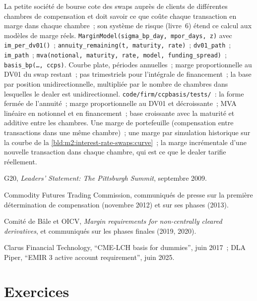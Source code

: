 \begin{build}
 La petite société de bourse cote des swaps auprès de clients de différentes
chambres de compensation et doit savoir ce que coûte chaque transaction en marge dans chaque
chambre~; son système de risque (livre~6) étend ce calcul
aux modèles de marge réels.
 \texttt{MarginModel(sigma\_bp\_day, mpor\_days, z)} avec
\texttt{im\_per\_dv01()}~; \texttt{annuity\_remaining(t, maturity, rate)}~;
\texttt{dv01\_path}~; \texttt{im\_path}~; \texttt{mva(notional, maturity, rate,
model, funding\_spread)}~; \texttt{basis\_bp(\ldots, ccps)}.
 Courbe plate, périodes annuelles~; marge proportionnelle au DV01 du swap
restant~; pas trimestriels pour l'intégrale de financement~; la base par position
unidirectionnelle, multipliée par le nombre de chambres dans lesquelles le dealer est
unidirectionnel.
 \texttt{code/firm/ccpbasis/tests/}~: la forme fermée de
l'annuité~; marge proportionnelle au DV01 et décroissante~; MVA linéaire en notionnel et en
financement~; base croissante avec la maturité et additive entre les chambres.
 Une marge de portefeuille (compensation entre transactions dans
une même chambre)~; une marge par simulation historique sur la courbe de
la \cref{bld:m2:interest-rate-swaps:curve}~; la marge incrémentale d'une nouvelle transaction
dans chaque chambre, qui est ce que le dealer tarifie réellement.
\end{build}

\begin{omsources}
\item G20, \emph{Leaders' Statement: The Pittsburgh Summit}, septembre 2009.
\item Commodity Futures Trading Commission, communiqués de presse sur la première
détermination de compensation (novembre 2012) et sur ses phases (2013).
\item Comité de Bâle et OICV, \emph{Margin requirements for non-centrally
cleared derivatives}, et communiqués sur les phases finales (2019, 2020).
\item Clarus Financial Technology, ``CME-LCH basis for dummies'', juin 2017~; DLA
Piper, ``EMIR 3 active account requirement'', juin 2025.
\end{omsources}

\section{Exercices}

